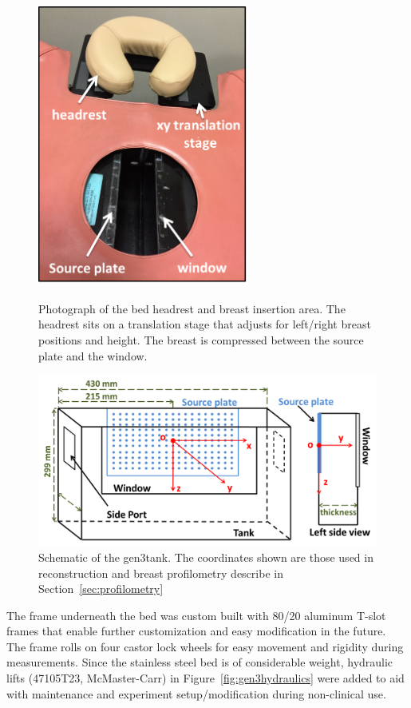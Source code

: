 \begin{figure}[p]
\centering
\includegraphics[width=7cm]{./figures/4_Gen3/gen3headrest.png}
\caption[Photograph of the bed headrest and breast insertion area.]{Photograph of the bed headrest and breast insertion area. The headrest sits on a translation stage that adjusts for left/right breast positions and height. The breast is compressed between the source plate and the window.}
\label{fig:gen3headrest}
\vspace{10mm}
\includegraphics[width=14.5cm]{./figures/4_Gen3/gen3tank.png}
\caption{Schematic of the gen3tank. The coordinates shown are those used in reconstruction and breast profilometry describe in Section~\ref{sec:profilometry}}
\label{fig:gen3tank}
\end{figure}

The frame underneath the bed was custom built with 80/20 aluminum T-slot frames that enable further customization and easy modification in the future. The frame rolls on four castor lock wheels for easy movement and rigidity during measurements. Since the stainless steel bed is of considerable weight, hydraulic lifts (47105T23, McMaster-Carr) in Figure~\ref{fig:gen3hydraulics} were added to aid with maintenance and experiment setup/modification during non-clinical use.

